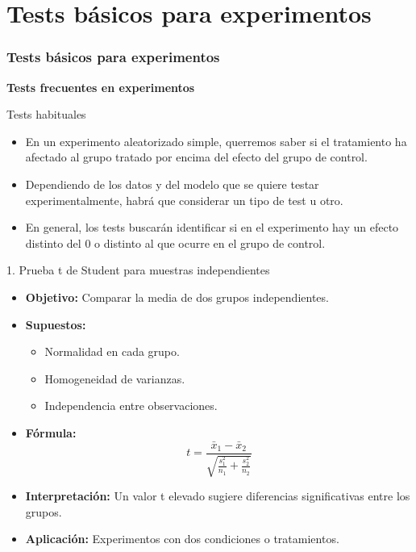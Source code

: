 ﻿\documentclass{beamer}
\begin{document}
\section{Tests básicos para experimentos}
\begin{frame}
    \frametitle{Tests básicos para experimentos}
    \centering
    \textbf{\Large Tests frecuentes en experimentos}
    \vspace{0.5cm}
\end{frame}

\begin{frame}{Tests habituales}
    \begin{itemize}
        \item En un experimento aleatorizado simple, querremos saber si el tratamiento ha afectado al grupo tratado por encima del efecto del grupo de control.
        \item Dependiendo de los datos y del modelo que se quiere testar experimentalmente, habrá que considerar un tipo de test u otro. 
        \item En general, los tests buscarán identificar si en el experimento hay un efecto distinto del 0 o distinto al que ocurre en el grupo de control.
    \end{itemize}
\end{frame}

\begin{frame}{1. Prueba t de Student para muestras independientes}
\begin{itemize}
    \item \textbf{Objetivo:} Comparar la media de dos grupos independientes.
    \item \textbf{Supuestos:}
    \begin{itemize}
         \item Normalidad en cada grupo.
         \item Homogeneidad de varianzas.
         \item Independencia entre observaciones.
    \end{itemize}
    \item \textbf{Fórmula:} 
    \[
    t = \frac{\bar{x}_1 - \bar{x}_2}{\sqrt{\frac{s_1^2}{n_1}+\frac{s_2^2}{n_2}}}
    \]
    \item \textbf{Interpretación:} Un valor t elevado sugiere diferencias significativas entre los grupos.
    \item \textbf{Aplicación:} Experimentos con dos condiciones o tratamientos.
\end{itemize}
\end{frame}
\end{document}
